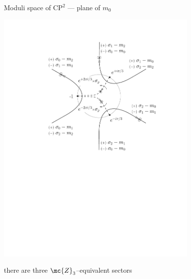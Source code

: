 \documentclass{beamer}
\begin{document}
\begin{frame}{Moduli space of $\text{CP}^2$ --- plane of $ m_0 $}

\vspace{-1.0cm}
\begin{center}
\hspace{-9mm}
\includegraphics[width=10cm]{fcp2.pdf}
\end{center}

\vspace{-6cm}
\centering
	there are three $ \mc{Z}_3 $--equivalent sectors

\end{frame}
\end{document}
